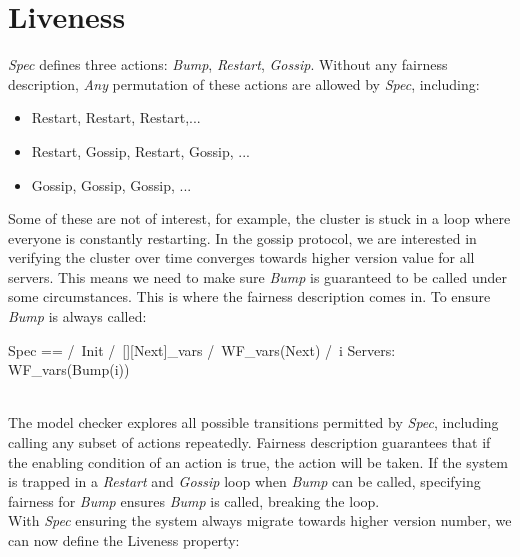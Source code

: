 \section{Liveness}

\textit{Spec} defines three actions: \textit{Bump}, \textit{Restart},
\textit{Gossip}. Without any fairness description, \textit{Any} permutation of
these actions are allowed by \textit{Spec}, including:
\begin{itemize}
    \item Restart, Restart, Restart,...
    \item Restart, Gossip, Restart, Gossip, ... 
    \item Gossip, Gossip, Gossip, ... 
\end{itemize}

Some of these are not of interest, for example, the cluster is stuck in a
loop where everyone is constantly restarting. In the gossip protocol, we are
interested in verifying the cluster over time converges towards higher version
value for all servers. This means we need to make sure \textit{Bump} is
guaranteed to be called under some circumstances. This is where the fairness
description comes in. To ensure \textit{Bump} is always called:\\

\begin{tla}
Spec ==
  /\ Init
  /\ [][Next]_vars
  /\ WF_vars(Next)
  /\ \A i \in Servers: 
    WF_vars(Bump(i))
\end{tla}
\begin{tlatex}
%
%
%
%
%
%
\end{tlatex}
\\

The model checker explores all possible transitions permitted by \textit{Spec}, 
including calling any subset of actions repeatedly.  Fairness description
guarantees that if the enabling condition of an action is true, the action will
be taken. If the system is trapped in a \textit{Restart} and \textit{Gossip}
loop when \textit{Bump} can be called, specifying fairness for \textit{Bump}
ensures \textit{Bump} is called, breaking the loop.\\

With \textit{Spec} ensuring the system always migrate towards higher version
number, we can now define the Liveness property:\\


